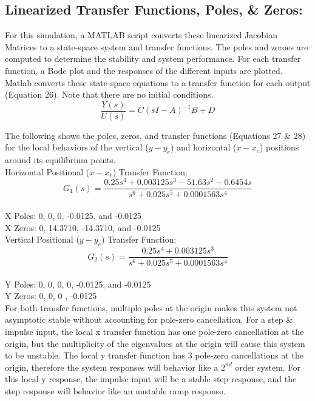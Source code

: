 \documentclass[conference]{IEEEtran}
\begin{document}
\newpage
\subsection{Linearized Transfer Functions, Poles, \& Zeros:}
For this simulation, a MATLAB script converts these linearized Jacobian Matrices to a state-space system and transfer functions. The poles and zeroes are computed to determine the stability and system performance. For each transfer function, a Bode plot and the responses of the different inputs are plotted. \\

Matlab converts these state-space equations to a transfer function for each output (Equation 26). Note that there are no initial conditions.
\[
 \frac{Y(s)}{U(s)} = C(sI-A)^{-1}B+D \tag{26}
\]

The following shows the poles, zeros, and transfer functions (Equations 27 \& 28) for the local behaviors of the vertical ($y - y_e$) and horizontal ($x - x_e$) positions around its equilibrium points.\\

Horizontal Positional ($x - x_e$) Transfer Function:\\
\[
G_1(s) = \frac{0.25 s^4 + 0.003125 s^3 - 51.63 s^2 - 0.6454 s}{s^6 + 0.025 s^5 + 0.0001563 s^4} \tag{27}
\]
\\
\noindent X Poles: 0, 0, 0, -0.0125, and -0.0125\\
X Zeros: 0, 14.3710, -14.3710, and -0.0125\\

Vertical Positional ($y - y_e$) Transfer Function:
\[
G_2(s) = \frac{0.25 s^4 + 0.003125 s^3}{s^6 + 0.025 s^5 + 0.0001563 s^4} \tag{28}
\]
\\
Y Poles: 0, 0, 0, 0, -0.0125, and -0.0125\\
Y Zeros: 0, 0, 0 , -0.0125\\

For both transfer functions, multiple poles at the origin makes this system not asymptotic stable without accounting for pole-zero cancellation. For a step \& impulse input, the local x transfer function has one pole-zero cancellation at the origin, but the multiplicity of the eigenvalues at the origin will cause this system to be unstable. The local y transfer function has 3 pole-zero cancellations at the origin, therefore the system responses will behavior like a $2^{nd}$ order system. For this local y response, the impulse input will be a stable step response, and the step response will behavior like an unstable ramp response. 
\end{document}
